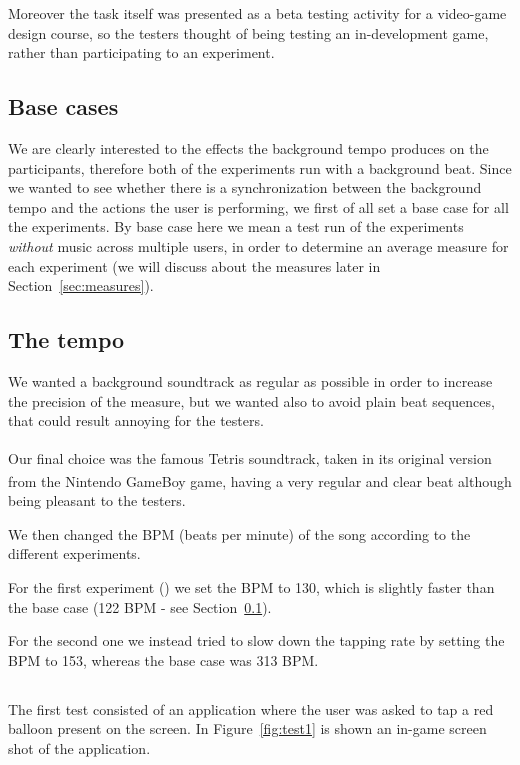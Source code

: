 Moreover the task itself was presented as a beta testing activity for a video-game design course, so the testers thought of being testing an in-development game, rather than participating to an experiment.

\subsection{Base cases}
\label{sec:base-cases}
We are clearly interested to the effects the background tempo produces on the participants, therefore both of the experiments run with a background beat.
Since we wanted to see whether there is a synchronization between the background tempo and the actions the user is performing, we first of all set a base case for all the experiments.
By base case here we mean a test run of the experiments \emph{without} music across multiple users, in order to determine an average measure for each experiment (we will discuss about the measures later in Section~\ref{sec:measures}).

\subsection{The tempo}
We wanted a background soundtrack as regular as possible in order to increase the precision of the measure, but we wanted also to avoid plain beat sequences, that could result annoying for the testers.

Our final choice was the famous Tetris\textsuperscript{\texttrademark} soundtrack, taken in its original version from the Nintendo\textsuperscript{\texttrademark} GameBoy\textsuperscript{\texttrademark} game, having a very regular and clear beat although being pleasant to the testers.

We then changed the BPM (beats per minute) of the song according to the different experiments.

For the first experiment () we set the BPM to 130, which is slightly faster than the base case (122 BPM - see Section~\ref{sec:base-cases}).

For the second one we instead tried to slow down the tapping rate by setting the BPM to 153, whereas the base case was 313 BPM.

\subsection{\testfirst}
\label{sec:test1}
The first test consisted of an application where the user was asked to tap a red balloon present on the screen. In Figure~\ref{fig:test1} is shown an in-game screen shot of the application.

